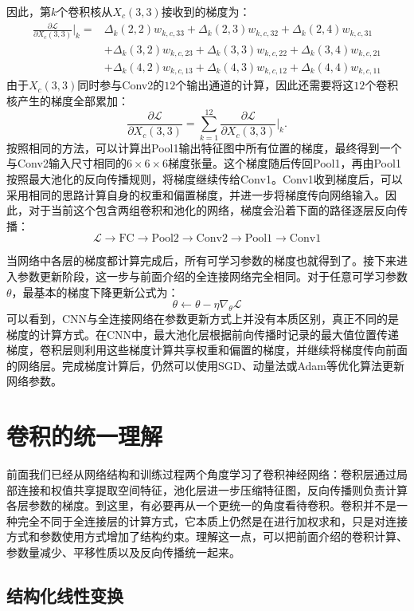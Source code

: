 因此，第$k$个卷积核从$X_c(3,3)$接收到的梯度为：
\begin{align*}
\frac{\partial\mathcal{L}}{\partial X_c(3,3)}\bigg|_k
={}&
\Delta_k(2,2)w_{k,c,33}+\Delta_k(2,3)w_{k,c,32}+\Delta_k(2,4)w_{k,c,31}\\
&+\Delta_k(3,2)w_{k,c,23}+\Delta_k(3,3)w_{k,c,22}+\Delta_k(3,4)w_{k,c,21}\\
&+\Delta_k(4,2)w_{k,c,13}+\Delta_k(4,3)w_{k,c,12}+\Delta_k(4,4)w_{k,c,11}
\end{align*}
由于$X_c(3,3)$同时参与Conv2的$12$个输出通道的计算，因此还需要将这$12$个卷积核产生的梯度全部累加：
$$
\frac{\partial\mathcal{L}}{\partial X_c(3,3)}
=
\sum_{k=1}^{12}
\frac{\partial\mathcal{L}}{\partial X_c(3,3)}
\bigg|_k.
$$
按照相同的方法，可以计算出Pool1输出特征图中所有位置的梯度，最终得到一个与Conv2输入尺寸相同的$6\times6\times6$梯度张量。这个梯度随后传回Pool1，再由Pool1按照最大池化的反向传播规则，将梯度继续传给Conv1。Conv1收到梯度后，可以采用相同的思路计算自身的权重和偏置梯度，并进一步将梯度传向网络输入。因此，对于当前这个包含两组卷积和池化的网络，梯度会沿着下面的路径逐层反向传播：
$$
\mathcal{L}\rightarrow\mathrm{FC}\rightarrow\mathrm{Pool2}\rightarrow\mathrm{Conv2}\rightarrow\mathrm{Pool1}\rightarrow\mathrm{Conv1}
$$

当网络中各层的梯度都计算完成后，所有可学习参数的梯度也就得到了。接下来进入参数更新阶段，这一步与前面介绍的全连接网络完全相同。对于任意可学习参数$\theta$，最基本的梯度下降更新公式为：
$$
\theta\leftarrow\theta-\eta\nabla_{\theta}\mathcal{L}
$$
可以看到，CNN与全连接网络在参数更新方式上并没有本质区别，真正不同的是梯度的计算方式。在CNN中，最大池化层根据前向传播时记录的最大值位置传递梯度，卷积层则利用这些梯度计算共享权重和偏置的梯度，并继续将梯度传向前面的网络层。完成梯度计算后，仍然可以使用SGD、动量法或Adam等优化算法更新网络参数。

\section{卷积的统一理解}

前面我们已经从网络结构和训练过程两个角度学习了卷积神经网络：卷积层通过局部连接和权值共享提取空间特征，池化层进一步压缩特征图，反向传播则负责计算各层参数的梯度。到这里，有必要再从一个更统一的角度看待卷积。卷积并不是一种完全不同于全连接层的计算方式，它本质上仍然是在进行加权求和，只是对连接方式和参数使用方式增加了结构约束。理解这一点，可以把前面介绍的卷积计算、参数量减少、平移性质以及反向传播统一起来。

\subsection{结构化线性变换}

